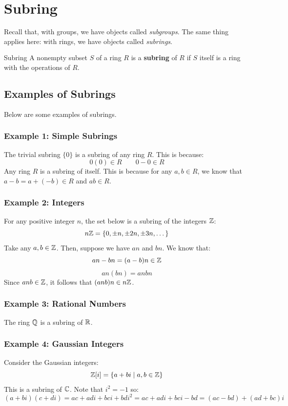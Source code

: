 \documentclass[letterpaper]{article}
\begin{document}
\newpage 
\section{Subring}
Recall that, with groups, we have objects called \emph{subgroups}. The same thing applies here: with rings, we have objects called \emph{subrings}.
\begin{definition}{Subring}{}
    A nonempty subset $S$ of a ring $R$ is a \textbf{subring} of $R$ if $S$ itself is a ring with the operations of $R$.
\end{definition}

\subsection{Examples of Subrings}
Below are some examples of subrings. 

\subsubsection{Example 1: Simple Subrings}
The trivial subring $\{0\}$ is a subring of any ring $R$. This is because:
\[0(0) \in R \qquad 0 - 0 \in R\]
Any ring $R$ is a subring of itself. This is because for any $a, b \in R$, we know that $a - b = a + (-b) \in R$ and $ab \in R$. 

\subsubsection{Example 2: Integers}
For any positive integer $n$, the set below is a subring of the integers $\mathbb{Z}$: 
\[n\mathbb{Z} = \{0, \pm n, \pm 2n, \pm 3n, \dots\}\]
Take any $a, b \in \mathbb{Z}$. Then, suppose we have $an$ and $bn$. We know that: 
\[an - bn = (a - b)n \in \mathbb{Z}\]
\[an(bn) = anbn\]
Since $anb \in \mathbb{Z}$, it follows that $(anb)n \in n\mathbb{Z}$. 

\subsubsection{Example 3: Rational Numbers}
The ring $\mathbb{Q}$ is a subring of $\mathbb{R}$. 


\subsubsection{Example 4: Gaussian Integers}
Consider the Gaussian integers:
\[\mathbb{Z}[i] = \{a + bi \mid a, b \in \mathbb{Z}\}\]
This is a subring of $\mathbb{C}$. Note that $i^2 = -1$ so:
\[(a + bi)(c + di) = ac + adi + bci + bdi^2 = ac + adi + bci - bd = (ac - bd) + (ad + bc)i\]
\end{document}
